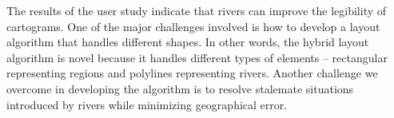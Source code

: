 The results of the user study indicate that rivers can improve the legibility of cartograms. One of the major challenges involved is how to develop a layout algorithm that handles different shapes. In other words, the hybrid layout algorithm is novel because it handles different types of elements -- rectangular representing regions and polylines representing rivers. Another challenge we overcome in developing the algorithm is to resolve stalemate situations introduced by rivers while minimizing geographical error.
